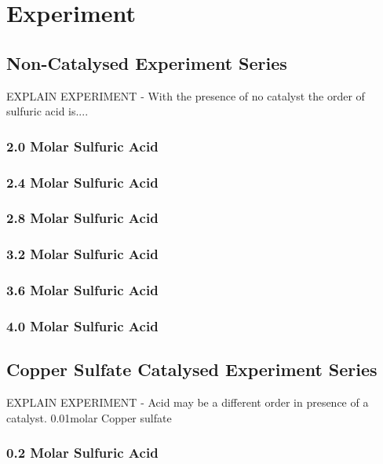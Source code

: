 \chapter {Experiment}

\section{Non-Catalysed Experiment Series}

EXPLAIN EXPERIMENT - With the presence of no catalyst the order of sulfuric acid is....

	\subsection{2.0 Molar Sulfuric Acid}

	\subsection{2.4 Molar Sulfuric Acid}

	\subsection{2.8 Molar Sulfuric Acid}

	\subsection{3.2 Molar Sulfuric Acid}

	\subsection{3.6 Molar Sulfuric Acid}

	\subsection{4.0 Molar Sulfuric Acid}

\section{Copper Sulfate Catalysed Experiment Series}

EXPLAIN EXPERIMENT - Acid may be a different order in presence of a catalyst. 0.01molar Copper sulfate 

	\subsection{0.2 Molar Sulfuric Acid}

